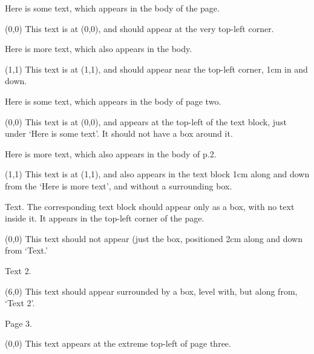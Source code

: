 \documentclass{article}
\begin{document}
Here is some text, which appears in the body of the page.
\begin{textblock}{5}(0,0)
This text is at (0,0), and should appear at the very top-left corner.
\end{textblock}

Here is more text, which also appears in the body.
\begin{textblock}{5}(1,1)
This text is at (1,1), and should appear near the top-left corner, 1cm
in and down.
\end{textblock}

\newpage
{}

Here is some text, which appears in the body of page two.
\begin{textblock}{5}(0,0)
This text is at (0,0), and appears at the top-left of the text block,
just under `Here is some text'.
It should not have a box around it.
\end{textblock}

\vskip4cm
Here is more text, which also appears in the body of p.2.
\begin{textblock}{5}(1,1)
This text is at (1,1), and also appears in the text block 1cm along
and down from the `Here is more text', and without a surrounding box.
\end{textblock}


\vskip4cm
Text.  The corresponding text block should appear only as a box, with
no text inside it.  It appears in the top-left corner of the page.
\begin{textblock}{5}(0,0)
This text should not appear (just the box, positioned 2cm along and
down from `Text.'
\end{textblock}


\vskip4cm
Text 2.
\begin{textblock}{5}(6,0)
This text should appear surrounded by a box, level with, but along from, `Text 2'.
\end{textblock}

\newpage
{}

Page 3.
\begin{textblock}{5}(0,0)
This text appears at the extreme top-left of page three.
\end{textblock}
\end{document}
